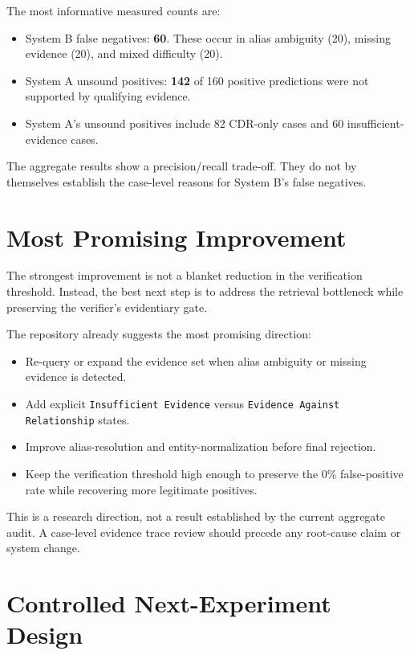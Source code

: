 \documentclass[11pt,a4paper]{article}
\begin{document}
The most informative measured counts are:

\begin{itemize}[leftmargin=1.5em]
  \item System B false negatives: \textbf{60}. These occur in alias ambiguity (20), missing evidence (20), and mixed difficulty (20).
  \item System A unsound positives: \textbf{142} of 160 positive predictions were not supported by qualifying evidence.
  \item System A's unsound positives include 82 CDR-only cases and 60 insufficient-evidence cases.
\end{itemize}

The aggregate results show a precision/recall trade-off. They do not by themselves establish the case-level reasons for System B's false negatives.

\section{Most Promising Improvement}

The strongest improvement is not a blanket reduction in the verification threshold. Instead, the best next step is to address the retrieval bottleneck while preserving the verifier's evidentiary gate.

The repository already suggests the most promising direction:

\begin{itemize}[leftmargin=1.5em]
  \item Re-query or expand the evidence set when alias ambiguity or missing evidence is detected.
  \item Add explicit \texttt{Insufficient Evidence} versus \texttt{Evidence Against Relationship} states.
  \item Improve alias-resolution and entity-normalization before final rejection.
  \item Keep the verification threshold high enough to preserve the 0\% false-positive rate while recovering more legitimate positives.
\end{itemize}

This is a research direction, not a result established by the current aggregate audit. A case-level evidence trace review should precede any root-cause claim or system change.

\section{Controlled Next-Experiment Design}
\end{document}

